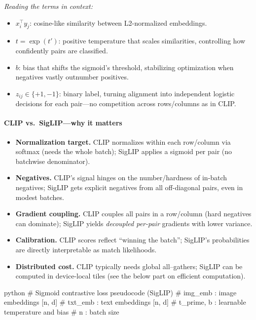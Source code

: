 \begin{enrichment}
\begin{enrichment}
        \emph{Reading the terms in context:}
        \begin{itemize}
            \item $x_i^\top y_j$: cosine-like similarity between L2-normalized embeddings.
            \item $t=\exp(t')$: positive temperature that scales similarities, controlling how confidently pairs are classified.
            \item $b$: bias that shifts the sigmoid’s threshold, stabilizing optimization when negatives vastly outnumber positives.
            \item $z_{ij}\in\{+1,-1\}$: binary label, turning alignment into independent logistic decisions for each pair—no competition across rows/columns as in CLIP.
        \end{itemize}
        
        \paragraph{CLIP vs.\ SigLIP—why it matters}
        \begin{itemize}
            \item \textbf{Normalization target.} CLIP normalizes within each row/column via softmax (needs the whole batch); SigLIP applies a sigmoid per pair (no batchwise denominator).
            \item \textbf{Negatives.} CLIP’s signal hinges on the number/hardness of in-batch negatives; SigLIP gets explicit negatives from all off-diagonal pairs, even in modest batches.
            \item \textbf{Gradient coupling.} CLIP couples all pairs in a row/column (hard negatives can dominate); SigLIP yields \emph{decoupled per-pair} gradients with lower variance.
            \item \textbf{Calibration.} CLIP scores reflect “winning the batch”; SigLIP’s probabilities are directly interpretable as match likelihoods.
            \item \textbf{Distributed cost.} CLIP typically needs global all–gathers; SigLIP can be computed in device-local tiles (see the below part on efficient computation).
        \end{itemize}
        
        \begin{mintedbox}{python}
            # Sigmoid contrastive loss pseudocode (SigLIP)
            # img_emb : image embeddings [n, d]
            # txt_emb : text embeddings  [n, d]
            # t_prime, b : learnable temperature and bias
            # n : batch size
            

\end{mintedbox}
\end{enrichment}
\end{enrichment}
